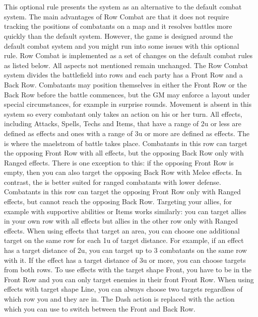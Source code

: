 %
\\\\
%
This optional rule presents the  system as an alternative to the default combat system.
The main advantages of Row Combat are that it does not require tracking the positions of combatants on a map and it resolves battles more quickly than the default system.
However, the game is designed around the default combat system and you might run into some issues with this optional rule.
Row Combat is implemented as a set of changes on the default combat rules as listed below.
All aspects not mentioned remain unchanged.
%
\ofpar
%
The Row Combat system divides the battlefield into rows and each party has a Front Row and a Back Row.
Combatants may position themselves in either the Front Row or the Back Row before the battle commences, but the GM may enforce a layout under special circumstances, for example in surprise rounds.
Movement is absent in this system so every combatant only takes an action on his or her turn.
All effects, including Attacks, Spells, Techs and Items, that have a range of 2u or less are defined as  effects and ones with a range of 3u or more are defined as  effects.
%
\ofpar
%
The  is where the maelstrom of battle takes place. 
Combatants in this row can target the opposing Front Row with all effects, but the opposing Back Row only with Ranged effects.
There is one exception to this: if the opposing Front Row is empty, then you can also target the opposing Back Row with Melee effects.
In contrast, the  is better suited for ranged combatants with lower defense.
Combatants in this row can target the opposing Front Row only with Ranged effects, but cannot reach the opposing Back Row. 
Targeting your allies, for example with supportive abilities or Items works similarly: you can target allies in your own row with all effects but allies in the other row only with Ranged effects.
%
\ofpar
%
When using effects that target an area, you can choose one additional target on the same row for each 1u of target distance. 
For example, if an effect has a target distance of 2u, you can target up to 3 combatants on the same row with it.
If the effect has a target distance of 3u or more, you can choose targets from both rows.
To use effects with the target shape Front, you have to be in the Front Row and you can only target enemies in their front Front Row. 
When using effects with target shape Line, you can always choose two targets regardless of which row you and they are in.
%
\ofpar
%
The Dash action is replaced with the  action which you can use to switch between the Front and Back Row.
